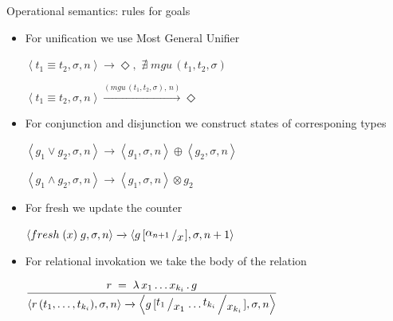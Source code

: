 \documentclass{beamer}
\newcommand{\inbr}[1]{\left<{#1}\right>}
\newcommand{\bigslant}[2]{{\raisebox{.2em}{$#1$}\left/\raisebox{-.2em}{$#2$}\right.}}
\theoremstyle{definition}
\theoremstyle{plain} %
\begin{document}
\begin{frame}{Operational semantics: rules for goals}

\begin{itemize}

\item For unification we use Most General Unifier

$\inbr{t_1 \equiv t_2, \sigma, n} \xrightarrow{} \Diamond , \, \, \nexists\; mgu\,(t_1, t_2, \sigma)$

$\inbr{t_1 \equiv t_2, \sigma, n} \xrightarrow{(mgu\,(t_1, t_2, \sigma),\, n)} \Diamond$

\vskip4mm

\item For conjunction and disjunction we construct states of corresponing types

$\inbr{g_1 \lor g_2, \sigma, n} \xrightarrow{} \inbr{g_1, \sigma, n} \oplus \inbr{g_2, \sigma, n}$

$\inbr{g_1 \land g_2, \sigma, n} \xrightarrow{} \inbr{ g_1, \sigma, n} \otimes g_2$

\vskip4mm

\item For fresh we update the counter

$\inbr{fresh \; (x) \; g, \sigma, n} \xrightarrow{} \inbr{g\,[\bigslant{\alpha_{n + 1}}{x}], \sigma, n + 1}$

\vskip4mm

\item For relational invokation we take the body of the relation

$\dfrac{r\;=\;\lambda\,x_1\dots x_{k_i}\,.\,g}{\inbr{r\,(t_1,\dots,t_{k_i}),\sigma,n} \xrightarrow{} \inbr{g\,[\bigslant{t_1}{x_1}\dots\bigslant{t_{k_i}}{x_{k_i}}], \sigma, n}}$

\end{itemize}

\end{frame}
\end{document}
